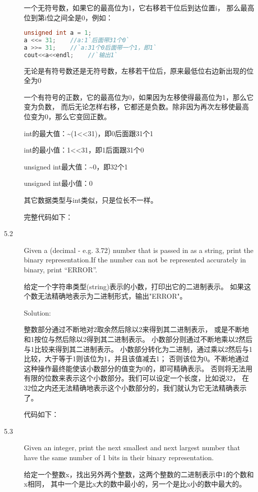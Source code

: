 \begin{description}
一个无符号数，如果它的最高位为1，它右移若干位后到达位置i， 那么最高位到第i位之间全是0，例如：
\begin{lstlisting}[language=C++]
unsigned int a = 1;
a <<= 31;    //a:1`后面带31个0`
a >>= 31;    //`a:31个0后面带一个1，即1`
cout<<a<<endl;    //`输出1`
\end{lstlisting}

无论是有符号数还是无符号数，左移若干位后，原来最低位右边新出现的位全为0

一个有符号的正数，它的最高位为0，如果因为左移使得最高位为1，那么它变为负数， 而后无论怎样右移，它都还是负数。除非因为再次左移使最高位变为0，那么它变回正数。

int的最大值：\textasciitilde(1<<31)，即0后面跟31个1

int的最小值：1<<31，即1后面跟31个0

unsigned int最大值：\textasciitilde 0，即32个1

unsigned int最小值：0

其它数据类型与int类似，只是位长不一样。

完整代码如下：



\item[5.2] Given a (decimal - e.g. 3.72) number that is passed in as a string, print the binary representation.If the number can not be represented accurately in binary, print “ERROR”.

给定一个字符串类型(string)表示的小数，打印出它的二进制表示。 如果这个数无法精确地表示为二进制形式，输出"ERROR"。

Solution:

整数部分通过不断地对2取余然后除以2来得到其二进制表示， 或是不断地和1按位与然后除以2得到其二进制表示。 小数部分则通过不断地乘以2然后与1比较来得到其二进制表示。 小数部分转化为二进制，通过乘以2然后与1比较，大于等于1则该位为1，并且该值减去1； 否则该位为0。不断地通过这种操作最终能使该小数部分的值变为0的，即可精确表示。 否则将无法用有限的位数来表示这个小数部分。我们可以设定一个长度，比如说32， 在32位之内还无法精确地表示这个小数部分的，我们就认为它无法精确表示了。

代码如下：



\item[5.3] Given an integer, print the next smallest and next largest number that have the same number of 1 bits in their binary representation.

给定一个整数x，找出另外两个整数，这两个整数的二进制表示中1的个数和x相同， 其中一个是比x大的数中最小的，另一个是比x小的数中最大的。


\end{description}
